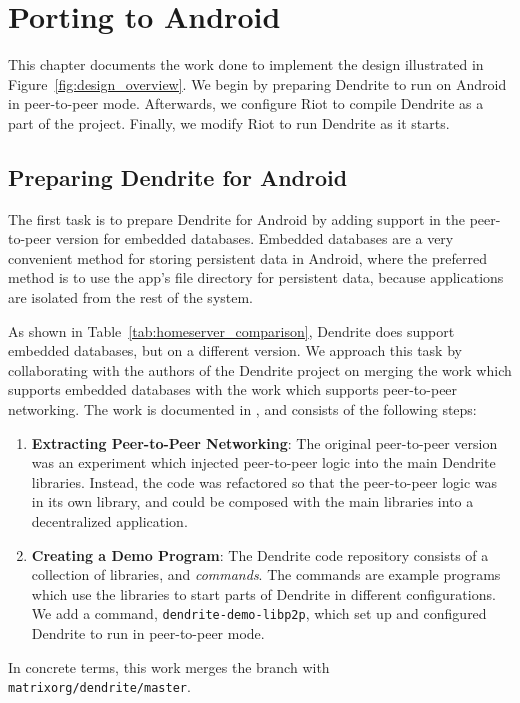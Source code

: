\chapter{Porting to Android}\label{chp:implementation}
This chapter documents the work done to implement the design illustrated in Figure~\ref{fig:design_overview}.
We begin by preparing Dendrite to run on Android in peer-to-peer mode.
Afterwards, we configure Riot to compile Dendrite as a part of the project.
Finally, we modify Riot to run Dendrite as it starts.

\section{Preparing Dendrite for Android}\label{sec:preparing_dendrite}
The first task is to prepare Dendrite for Android by adding support in the peer-to-peer version for embedded databases.
Embedded databases are a very convenient method for storing persistent data in Android, where the preferred method is to use the app's file directory for persistent data\footnotemark, because applications are isolated from the rest of the system.
%

As shown in Table~\ref{tab:homeserver_comparison}, Dendrite does support embedded databases, but on a different version.
We approach this task by collaborating with the authors of the Dendrite project on merging the work which supports embedded databases with the work which supports peer-to-peer networking.
The work is documented in , and consists of the following steps:
\begin{enumerate}
	\item{
	      \textbf{Extracting Peer-to-Peer Networking}:
	      The original peer-to-peer version was an experiment which injected peer-to-peer logic into the main Dendrite libraries.
	      Instead, the code was refactored so that the peer-to-peer logic was in its own library, and could be composed with the main libraries into a decentralized application.
	      }
	\item{
	      \textbf{Creating a Demo Program}:
	      The Dendrite code repository consists of a collection of libraries, and \textit{commands}.
	      The commands are example programs which use the libraries to start parts of Dendrite in different configurations.
	      We add a command, \texttt{dendrite-demo-libp2p}, which set up and configured Dendrite to run in peer-to-peer mode.
	      }
\end{enumerate}
In concrete terms, this work merges the  branch with \texttt{matrix\-org/dendrite/master}.

